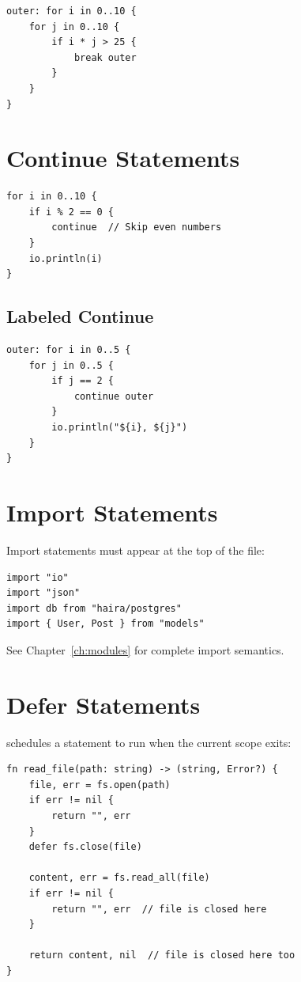 \begin{lstlisting}
outer: for i in 0..10 {
    for j in 0..10 {
        if i * j > 25 {
            break outer
        }
    }
}
\end{lstlisting}

\section{Continue Statements}

\begin{lstlisting}
for i in 0..10 {
    if i % 2 == 0 {
        continue  // Skip even numbers
    }
    io.println(i)
}
\end{lstlisting}

\subsection{Labeled Continue}

\begin{lstlisting}
outer: for i in 0..5 {
    for j in 0..5 {
        if j == 2 {
            continue outer
        }
        io.println("${i}, ${j}")
    }
}
\end{lstlisting}

\section{Import Statements}

Import statements must appear at the top of the file:

\begin{lstlisting}
import "io"
import "json"
import db from "haira/postgres"
import { User, Post } from "models"
\end{lstlisting}

See Chapter~\ref{ch:modules} for complete import semantics.

\section{Defer Statements}

 schedules a statement to run when the current scope exits:

\begin{lstlisting}
fn read_file(path: string) -> (string, Error?) {
    file, err = fs.open(path)
    if err != nil {
        return "", err
    }
    defer fs.close(file)

    content, err = fs.read_all(file)
    if err != nil {
        return "", err  // file is closed here
    }

    return content, nil  // file is closed here too
}
\end{lstlisting}

